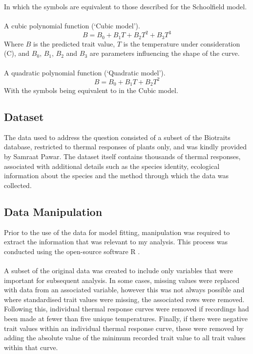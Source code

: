 \documentclass[11pt]{article}
\begin{document}
In which the symbols are equivalent to those described for the Schoolfield model. 
\\
\\
A cubic polynomial function (`Cubic model').
\begin{equation}
B = B_0 + B_1T + B_2T^2 + B_3T^3
\end{equation}
Where \begin{math}B\end{math} is the predicted trait value, \begin{math}T\end{math} is the temperature under consideration (\degree C), and \begin{math}B_0\end{math}, \begin{math}B_1\end{math}, \begin{math}B_2\end{math} and \begin{math}B_3\end{math} are parameters influencing the shape of the curve.
\\
\\
A quadratic polynomial function (`Quadratic model').
\begin{equation}
B = B_0 + B_1T + B_2T^2
\end{equation}
With the symbols being equivalent to in the Cubic model.

\subsection{Dataset}
The data used to address the question consisted of a subset of the Biotraits database, restricted to thermal responses of plants only, and was kindly provided by Samraat Pawar. The dataset itself contains thousands of thermal responses, associated with additional details such as the species identity, ecological information about the species and the method through which the data was collected. 

\subsection{Data Manipulation}
Prior to the use of the data for model fitting, manipulation was required to extract the information that was relevant to my analysis. This process was conducted using the open-source software R \cite{R}.
\\
\\
A subset of the original data was created to include only variables that were important for subsequent analysis. In some cases, missing values were replaced with data from an associated variable, however this was not always possible and where standardised trait values were missing, the associated rows were removed. Following this, individual thermal response curves were removed if recordings had been made at fewer than five unique temperatures. Finally, if there were negative trait values within an individual thermal response curve, these were removed by adding the absolute value of the minimum recorded trait value to all trait values within that curve. 
\end{document}
